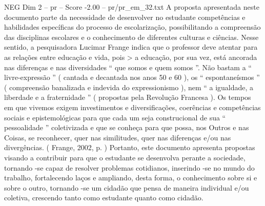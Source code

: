 \begin{textsample}{NEG Dim 2 – pr – Score -2.00 – pr/pr\_em\_32.txt}
A proposta apresentada neste documento parte da necessidade de desenvolver no estudante competências e habilidades específicas do processo de escolarização, possibilitando a compreensão das disciplinas escolares e o conhecimento de diferentes culturas e ciências.
Nesse sentido, a pesquisadora Lucimar Frange indica que o professor deve atentar para as relações entre educação e vida, pois > a educação, por sua vez, está ancorada nas diferenças e nas diversidades “ que somos e quem somos ”.
Não bastam a “ livre-expressão ” ( cantada e decantada nos anos 50 e 60 ), os “ espontaneísmos ” ( compreensão banalizada e indevida do expressionismo ), nem “ a igualdade, a liberdade e a fraternidade ” ( propostas pela Revolução Francesa ).
Os tempos em que vivemos exigem investimentos e diversificações, coerências e competências sociais e epistemológicas para que cada um seja construcional de sua “ pessoalidade ” coletivizada e que se conheça para que possa, nos Outros e nas Coisas, se reconhecer, quer nas similitudes, quer nas diferenças e/ou nas divergências. ( Frange, 2002, p. ) Portanto, este documento apresenta propostas visando a contribuir para que o estudante se desenvolva perante a sociedade, tornando -se capaz de resolver problemas cotidianos, inserindo -se no mundo do trabalho, fortalecendo laços e ampliando, desta forma, o conhecimento sobre si e sobre o outro, tornando -se um cidadão que pensa de maneira individual e/ou coletiva, crescendo tanto como estudante quanto como cidadão.

\end{textsample}
